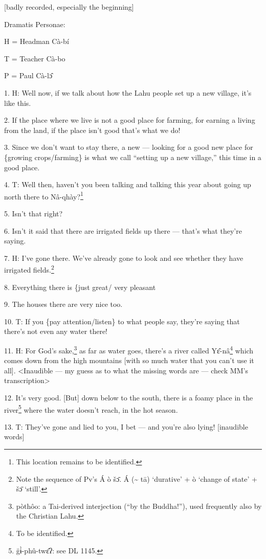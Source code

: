 
[badly recorded, especially the beginning]

Dramatis Personae:

H = Headman Cà-bí

T = Teacher Cà-bo

P = Paul Cà-lɔ̂

1. H: Well now, if we talk about how the Lahu people set up a new village, it's
like this.

2. If the place where we live is not a good place for farming, for earning a living
from the land, if the place isn't good that's what we do!

3. Since we don't want to stay there, a new --- looking for a good new place for
\{growing crops/farming\} is what we call ``setting up a new village,'' this time
in a good place.

4. T: Well then, haven't you been talking and talking this year about going up
north there to Nâ-qhày?\footnote{This location remains to be identified.}

5. Isn't that right?

6. Isn't it said that there are irrigated fields up there --- that's what they're
saying.

7. H: I've gone there. We've already gone to look and see whether they have irrigated
fields.\footnote{Note the sequence of Pv's Á ò šɔ̄. Á (\textasciitilde{} tā) `durative' + ò `change of state' + šɔ̄ `still'.}

8. Everything there is \{just great/ very pleasant

9. The houses there are very nice too.

10. T: If you \{pay attention/listen\} to what people say, they're saying that
there's not even any water there!

11. H: For God's sake,\footnote{pòthôo: a Tai-derived interjection (``by the Buddha!''), used frequently also by the Christian Lahu.} as far as water goes, there's a river called Yɛ̂-nâ\footnote{To be identified.}
which comes down from the high mountains [with so much water that you can't use
it all]. <Inaudible --- my guess as to what the missing words are ---
check MM's transcription>

12. It's very good. [But] down below to the south, there is a foamy place in the
river\footnote{g̈ɨ̀-phû-twɛ̂ʔ: see DL 1145.} where the water doesn't reach, in the hot season.

13. T: They've gone and lied to you, I bet --- and you're also lying! [inaudible
words]

